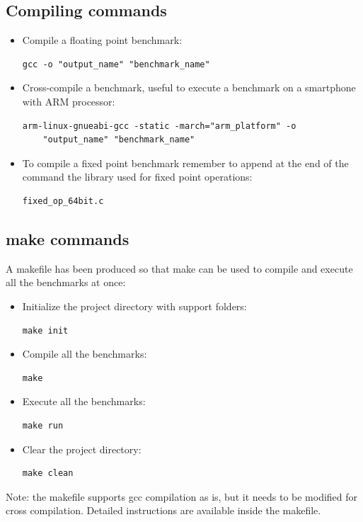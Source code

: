 \subsection{Compiling commands}

\begin{itemize}
	\item Compile a floating point benchmark: \begin{verbatim}gcc -o "output_name" "benchmark_name"\end{verbatim}
	\item Cross-compile a benchmark, useful to execute a benchmark on a smartphone with ARM processor: \begin{verbatim}arm-linux-gnueabi-gcc -static -march="arm_platform" -o 
	"output_name" "benchmark_name"\end{verbatim}
	\item To compile a fixed point benchmark remember to append at the end of the command the library used for fixed point operations: \begin{verbatim}fixed_op_64bit.c\end{verbatim}
\end{itemize}


\subsection{make commands}

A makefile has been produced so that make can be used to compile and execute all the benchmarks at once:

\begin{itemize}
	\item Initialize the project directory with support folders:\begin{verbatim}make init\end{verbatim}
	\item Compile all the benchmarks: \begin{verbatim}make\end{verbatim}
	\item Execute all the benchmarks: \begin{verbatim}make run\end{verbatim}
	\item Clear the project directory: \begin{verbatim}make clean\end{verbatim}
\end{itemize}

Note: the makefile supports gcc compilation as is, but it needs to be modified for cross compilation. Detailed instructions are available inside the makefile.

